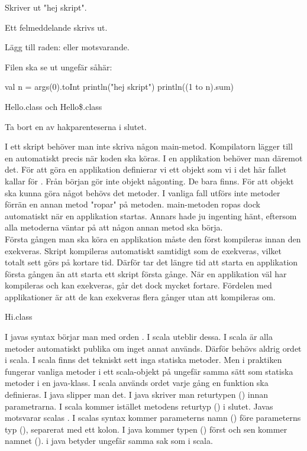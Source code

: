 \Task 

\Subtask Skriver ut "hej skript".

\Subtask Ett felmeddelande skrivs ut.

\Subtask Lägg till raden:
eller motsvarande.

\Subtask Filen ska se ut ungefär såhär: \\
\begin{Code} 
val n = args(0).toInt 
println("hej skript") 
println((1 to n).sum)
\end{Code}

\Subtask {}

\Task 

\Subtask Hello.class och Hello\$.class

\Subtask Ta bort en av hakparenteserna i slutet.

\Subtask I ett skript behöver man inte skriva någon main-metod. Kompilatorn lägger till en automatiskt precis när koden ska köras. I en applikation behöver man däremot det. För att göra en applikation definierar vi ett objekt som vi i det här fallet kallar för . Från början gör inte objekt någonting. De bara finns. För att objekt ska kunna göra något behövs det metoder. I vanliga fall utförs inte metoder förrän en annan metod "ropar" på metoden. main-metoden ropas dock automatiskt när en applikation startas. Annars hade ju ingenting hänt, eftersom alla metoderna väntar på att någon annan metod ska börja. \\
\Subtask Första gången man ska köra en applikation måste den först kompileras innan den exekveras. Skript kompileras automatiskt samtidigt som de exekveras, vilket totalt sett görs på kortare tid. Därför tar det längre tid att starta en applikation första gången än att starta ett skript första gånge. När en applikation väl har kompileras och kan exekveras, går det dock mycket fortare. Fördelen med applikationer är att de kan exekveras flera gånger utan att kompileras om.

\Task 

\Subtask Hi.class

\Subtask I javas syntax börjar man med orden . I scala uteblir dessa. I scala är alla metoder automatiskt publika om inget annat används. Därför behövs aldrig ordet  i scala. I scala finns det tekniskt sett inga statiska metoder. Men i praktiken fungerar vanliga metoder i ett scala-objekt på ungefär samma sätt som statiska metoder i en java-klass. I scala används ordet  varje gång en funktion ska definieras. I java slipper man det. I java skriver man returtypen () innan parametrarna. I scala kommer istället metodens returtyp () i slutet. Javas  motsvarar scalas . I scalas syntax kommer parameterns namn () före parameterns typ (), separerat med ett kolon. I java kommer typen () först och sen kommer namnet ().  i java betyder ungefär samma sak som  i scala.

